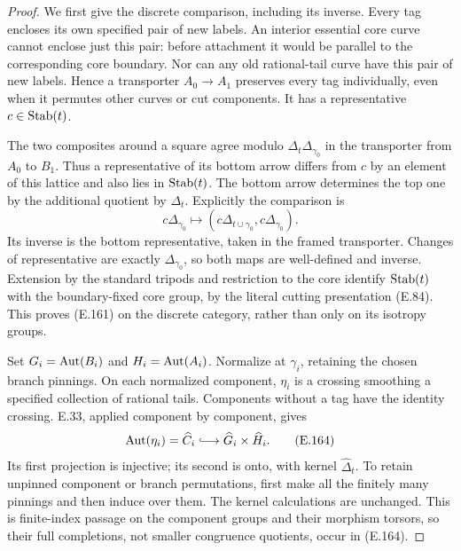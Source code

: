 \begin{proof}
We first give the discrete comparison, including its inverse.
Every tag encloses its own specified pair of new labels.  An
interior essential core curve cannot enclose just this pair:
before attachment it would be parallel to the corresponding core
boundary.  Nor can any old rational-tail curve have this pair of
new labels.  Hence a transporter $A_0\to A_1$ preserves every tag
individually, even when it permutes other curves or cut components.
It has a representative $c\in\operatorname{Stab}(t)$.

The two composites around a square agree modulo
$\Delta_t\Delta_{\gamma_0}$ in the transporter from $A_0$ to
$B_1$.  Thus a representative of its bottom arrow differs from
$c$ by an element of this lattice and also lies in $\operatorname{Stab}(t)$.
The bottom arrow determines the top one by the additional quotient
by $\Delta_t$.  Explicitly the comparison is
\[
 c\Delta_{\gamma_0}\longmapsto
       (c\Delta_{t\cup\gamma_0},c\Delta_{\gamma_0}).          \tag{E.163}
\]
Its inverse is the bottom representative, taken in the framed
transporter.  Changes of representative are exactly
$\Delta_{\gamma_0}$, so both maps are well-defined and inverse.
Extension by the standard tripods and restriction to the core
identify $\operatorname{Stab}(t)$ with the boundary-fixed core group, by the
literal cutting presentation (E.84).  This proves (E.161) on the
discrete category, rather than only on its isotropy groups.

Set $G_i=\operatorname{Aut}(B_i)$ and $H_i=\operatorname{Aut}(A_i)$.  Normalize at
$\gamma_i$, retaining the chosen branch pinnings.  On each
normalized component, $\eta_i$ is a crossing smoothing a specified
collection of rational tails.  Components without a tag have the
identity crossing.  E.33, applied component by component, gives
\[
 \Aut(\eta_i)=\widehat C_i
       \lhook\joinrel\longrightarrow\widehat G_i\times
                                      \widehat H_i.           \tag{E.164}
\]
Its first projection is injective; its second is onto, with kernel
$\widehat\Delta_t$.  To retain unpinned component or branch
permutations, first make all the finitely many pinnings and then
induce over them.  The kernel calculations are unchanged.  This
is finite-index passage on the component groups and their
morphism torsors, so their full completions, not smaller
congruence quotients, occur in (E.164).


\end{proof}
